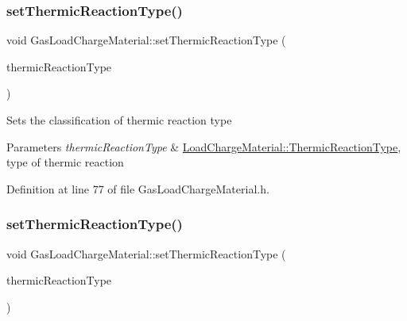\subsubsection{\texorpdfstring{set\+Thermic\+Reaction\+Type()}{setThermicReactionType()}\hspace{0.1cm}{\footnotesize\ttfamily [2/3]}}
{\footnotesize\ttfamily void Gas\+Load\+Charge\+Material\+::set\+Thermic\+Reaction\+Type (\begin{DoxyParamCaption}\item[{\hyperlink{namespace_load_charge_material_a51d4263e865a5d86236622dd3fe23fd1}{Load\+Charge\+Material\+::\+Thermic\+Reaction\+Type}}]{thermic\+Reaction\+Type }\end{DoxyParamCaption})\hspace{0.3cm}{\ttfamily [inline]}}

Sets the classification of thermic reaction type 
\begin{DoxyParams}{Parameters}
{\em thermic\+Reaction\+Type} & \hyperlink{namespace_load_charge_material_a51d4263e865a5d86236622dd3fe23fd1}{Load\+Charge\+Material\+::\+Thermic\+Reaction\+Type}, type of thermic reaction \\
\hline
\end{DoxyParams}


Definition at line 77 of file Gas\+Load\+Charge\+Material.\+h.

\mbox{\label{class_gas_load_charge_material_ac48eb07a3008f1dc0ff433353b59536d}} 
\subsubsection{\texorpdfstring{set\+Thermic\+Reaction\+Type()}{setThermicReactionType()}\hspace{0.1cm}{\footnotesize\ttfamily [3/3]}}
{\footnotesize\ttfamily void Gas\+Load\+Charge\+Material\+::set\+Thermic\+Reaction\+Type (\begin{DoxyParamCaption}\item[{\hyperlink{namespace_load_charge_material_a51d4263e865a5d86236622dd3fe23fd1}{Load\+Charge\+Material\+::\+Thermic\+Reaction\+Type}}]{thermic\+Reaction\+Type }\end{DoxyParamCaption})\hspace{0.3cm}{\ttfamily [inline]}}

